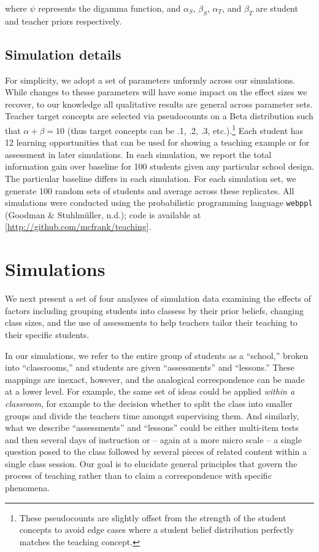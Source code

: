 \documentclass[10pt, letterpaper]{article}
\begin{document}
\noindent where \(\psi\) represents the digamma function, and
\(\alpha_S\), \(\beta_S\), \(\alpha_T\), and \(\beta_T\) are student and
teacher priors respectively.

\subsection{Simulation details}\label{simulation-details}

For simplicity, we adopt a set of parameters unformly across our
simulations. While changes to thesse parameters will have some impact on
the effect sizes we recover, to our knowledge all qualitative results
are general across parameter sets. Teacher target concepts are selected
via pseudocounts on a Beta distribution such that
\(\alpha + \beta = 10\) (thus target concepts can be .1, .2, .3,
etc.).\footnote{These pseudocounts are slightly offset from the strength of the student concepts to avoid edge cases where a student belief distribution perfectly matches the teaching concept.}
Each student has 12 learning opportunities that can be used for showing
a teaching example or for assessment in later simulations. In each
simulation, we report the total information gain over baseline for 100
students given any particular school design. The particular baseline
differs in each simulation. For each simulation set, we generate 100
random sets of students and average across these replicates. All
simulations were conducted using the probabilistic programming language
\texttt{webppl} (Goodman \& Stuhlmüller, n.d.); code is available at
{[}\url{http://github.com/mcfrank/teaching}{]}.

\section{Simulations}\label{simulations}

We next present a set of four analyses of simulation data examining the
effects of factors including grouping students into classess by their
prior beliefs, changing class sizes, and the use of assessments to help
teachers tailor their teaching to their specific students.

In our simulations, we refer to the entire group of students as a
``school,'' broken into ``classrooms,'' and students are given
``assessments'' and ``lessons.'' These mappings are inexact, however,
and the analogical correspondence can be made at a lower level. For
example, the same set of ideas could be applied \emph{within a
classroom}, for example to the decision whether to split the class into
smaller groups and divide the teachers time amongst supervising them.
And similarly, what we describe ``assessments'' and ``lessons'' could be
either multi-item tests and then several days of instruction or -- again
at a more micro scale -- a single question posed to the class followed
by several pieces of related content within a single class session. Our
goal is to elucidate general principles that govern the process of
teaching rather than to claim a correspondence with specific phenomena.
\end{document}
